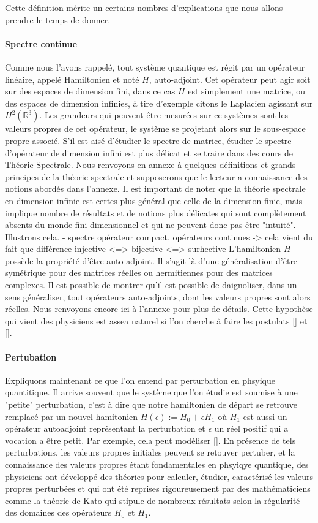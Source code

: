 \documentclass[12pt,openany,a4paper, titlepage]{article}
\newcommand{\R}{\mathbb{R}}
\theoremstyle{definition}
\theoremstyle{definition}
\theoremstyle{definition}
\theoremstyle{definition}
\theoremstyle{definition}
\begin{document}
Cette définition mérite un certains nombres d'explications que nous allons  prendre le temps de donner. 

\paragraph{Spectre continue}
Comme nous l'avons rappelé, tout système quantique est régit par un opérateur linéaire, appelé Hamiltonien et noté $H$, auto-adjoint. Cet opérateur peut agir soit sur des espaces  de dimension fini, dans ce cas $H$ est simplement une matrice, ou des espaces de dimension infinies, à tire d'exemple citons le Laplacien agissant sur $H^2(\R^3)$. Les grandeurs qui peuvent être mesurées sur ce systèmes sont les valeurs propres de cet opérateur, le système se projetant alors sur le sous-espace propre associé. S'il est aisé d'étudier le spectre de matrice, étudier le spectre d'opérateur de dimension infini est plus délicat et se traire dans des cours de Théorie Spectrale. Nous renvoyons en annexe à quelques définitions et grands principes de la théorie spectrale et supposerons que le lecteur a connaissance des notions abordés dans l'annexe. Il est important de noter que la théorie spectrale en dimension infinie est certes plus général que celle de la dimension finie, mais implique nombre de résultats et de notions plus délicates qui sont complètement absents du monde fini-dimensionnel et qui ne peuvent donc pas être "intuité". Illustrons cela.
- spectre opérateur compact, opérateurs continues -> cela vient du fait que différence injective <=> bijective <=> surhective
L'hamiltonien $H$ possède la propriété d'être auto-adjoint. Il s'agit là d'une généralisation d'être symétrique pour des matrices réelles ou hermitiennes pour des matrices complexes. Il est possible de montrer qu'il est possible de daignoliser, dans un sens généraliser, tout opérateurs auto-adjoints, dont les valeurs propres sont alors réelles. Nous renvoyons encore ici à l'annexe pour plus de détails. Cette hypothèse qui vient des physiciens est assea naturel si l'on cherche à faire les postulats [] et [].

\paragraph{Pertubation}
Expliquons maintenant ce que l'on entend par perturbation en phsyique quantitique. Il arrive souvent que le système que l'on étudie est soumise à une "petite" perturbation, c'est à dire que notre hamiltonien de départ se retrouve remplacé par un nouvel hamitonien $H(\epsilon) := H_0 + \epsilon H_1$ où $H_1$ est aussi un opérateur autoadjoint représentant la perturbation et $\epsilon$ un réel positif qui a vocation a être petit.  Par exemple, cela peut modéliser []. En présence de tels perturbations, les valeurs propres initiales peuvent se retouver pertuber, et la connaissance des valeurs propres étant fondamentales en phsyiqye quantique, des physiciens ont développé des théories pour calculer, étudier, caractérisé les valeurs propres perturbées et qui ont été reprises rigoureusement par des mathématiciens comme la théorie de Kato qui stipule de nombreux résultats selon la régularité des domaines des opérateurs $H_0$ et $H_1$. 
\end{document}
